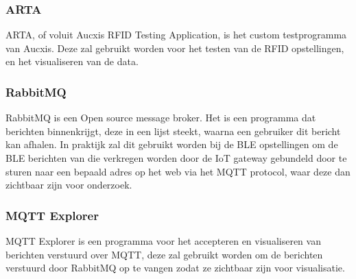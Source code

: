 \subsubsection{ARTA}
ARTA, of voluit Aucxis RFID Testing Application, is het custom testprogramma van Aucxis. Deze zal gebruikt worden voor het testen van de RFID opstellingen, en het visualiseren van de data.

\subsubsection{RabbitMQ}
RabbitMQ is een Open source message broker. Het is een programma dat berichten binnenkrijgt, deze in een lijst steekt, waarna een gebruiker dit bericht kan afhalen. In praktijk zal dit gebruikt worden bij de BLE opstellingen om de BLE berichten van die verkregen worden door de IoT gateway gebundeld door te sturen naar een bepaald adres op het web via het MQTT protocol, waar deze dan zichtbaar zijn voor onderzoek.\autocite{RabbitMQ2022}

\subsubsection{MQTT Explorer}
MQTT Explorer is een programma voor het accepteren en visualiseren van berichten verstuurd over MQTT, deze zal gebruikt worden om de berichten verstuurd door RabbitMQ op te vangen zodat ze zichtbaar zijn voor visualisatie.\autocite{Nordquist2019}
